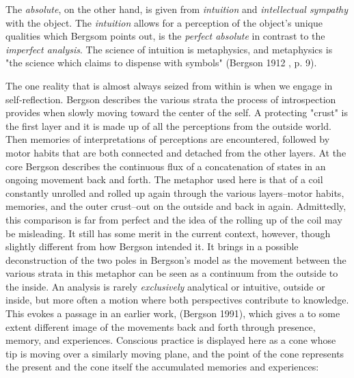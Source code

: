 \documentclass[11pt]{article}
\makeatletter
\newcommand{\cslcitation}[2]
 {\protect\hyper@linkstart{cite}{citeproc_bib_item_#1}#2\hyper@linkend}
\makeatother
\begin{document}
The \emph{absolute}, on the other hand, is given from \emph{intuition} and \emph{intellectual sympathy} with the object.
The \emph{intuition} allows for a perception of the object's unique qualities which Bergsom points out, is the \emph{perfect absolute} in contrast to the \emph{imperfect analysis}.
The science of intuition is metaphysics, and metaphysics is "the science which claims to dispense with symbols" (\cslcitation{2}{Bergson 1912} , p. 9).

The one reality that is almost always seized from within is when we engage in self-reflection.
Bergson describes the various strata the process of introspection provides when slowly moving toward the center of the self.
A protecting "crust" is the first layer and it is made up of all the perceptions from the outside world.
Then memories of interpretations of perceptions are encountered, followed by motor habits that are both connected and detached from the other layers.
At the core Bergson describes the continuous flux of a concatenation of states in an ongoing movement back and forth.
The metaphor used here is that of a coil constantly unrolled and rolled up again through the various layers--motor habits, memories, and the outer crust--out on the outside and back in again.
Admittedly, this comparison is far from perfect and the idea of the rolling up of the coil may be misleading.
It still has some merit in the current context, however, though slightly different from how Bergson intended it.
It brings in a possible deconstruction of the two poles in Bergson's model as the movement between the various strata in this metaphor can be seen as a continuum from the outside to the inside.
An analysis is rarely \emph{exclusively} analytical or intuitive, outside or inside, but more often a motion where both perspectives contribute to knowledge. 
This evokes a passage in an earlier work, (\cslcitation{3}{Bergson 1991}), which gives a to some extent different image of the movements back and forth through presence, memory, and experiences.
Conscious practice is displayed here as a cone whose tip is moving over a similarly moving plane, and the point of the cone represents the present and the cone itself the accumulated memories and experiences: 
\end{document}
